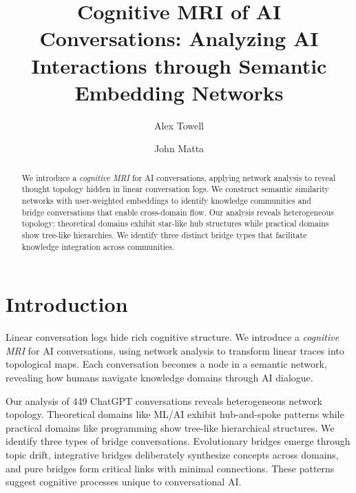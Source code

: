 \documentclass{svproc}
\begin{document}
\mainmatter
\title{Cognitive MRI of AI Conversations: Analyzing AI Interactions through Semantic Embedding Networks}


\author{Alex Towell \and John Matta}


\maketitle

\begin{abstract}
We introduce a \emph{cognitive MRI} for AI conversations, applying network analysis to reveal thought topology hidden in linear conversation logs. We construct semantic similarity networks with user-weighted embeddings to identify knowledge communities and bridge conversations that enable cross-domain flow. Our analysis reveals heterogeneous topology: theoretical domains exhibit star-like hub structures while practical domains show tree-like hierarchies. We identify three distinct bridge types that facilitate knowledge integration across communities.
\end{abstract}

\section{Introduction}

Linear conversation logs hide rich cognitive structure. We introduce a \emph{cognitive MRI} for AI conversations, using network analysis to transform linear traces into topological maps. Each conversation becomes a node in a semantic network, revealing how humans navigate knowledge domains through AI dialogue.

Our analysis of 449 ChatGPT conversations reveals heterogeneous network topology. Theoretical domains like ML/AI exhibit hub-and-spoke patterns while practical domains like programming show tree-like hierarchical structures. We identify three types of bridge conversations. Evolutionary bridges emerge through topic drift, integrative bridges deliberately synthesize concepts across domains, and pure bridges form critical links with minimal connections. These patterns suggest cognitive processes unique to conversational AI.
\end{document}
